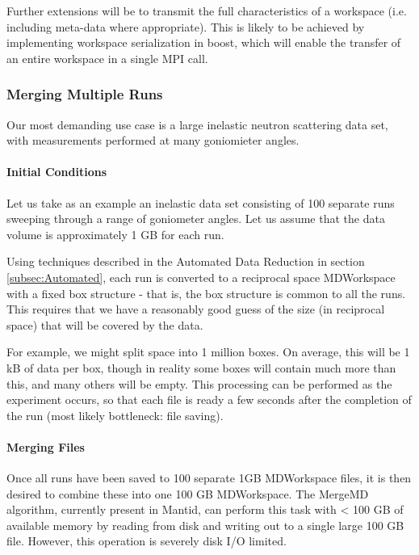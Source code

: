 Further extensions will be to transmit the full characteristics of a workspace (i.e. including meta-data where appropriate). This is likely to be achieved by implementing workspace serialization in boost, which will enable the transfer of an entire workspace in a single MPI call.

\subsubsection{Merging Multiple Runs}

Our most demanding use case is a large inelastic neutron scattering data set, with measurements performed at many goniomieter angles.

\paragraph{Initial Conditions}

Let us take as an example an inelastic data set consisting of 100 separate runs sweeping through a range of goniometer angles. Let us assume that the data volume is approximately 1 GB for each run.

Using techniques described in the Automated Data Reduction in section \ref{subsec:Automated}, each run is converted to a reciprocal space MDWorkspace with a fixed box structure - that is, the box structure is common to all the runs. This requires that we have a reasonably good guess of the size (in reciprocal space) that will be covered by the data. 

For example, we might split space into 1 million boxes. On average, this will be 1 kB of data per box, though in reality some boxes will contain much more than this, and many others will be empty. This processing can be performed as the experiment occurs, so that each file is ready a few seconds after the completion of the run (most likely bottleneck: file saving).

\paragraph{Merging Files}

Once all runs have been saved to 100 separate 1GB MDWorkspace files, it is then desired to combine these into one 100 GB MDWorkspace. The MergeMD algorithm, currently present in Mantid, can perform this task with < 100 GB of available memory by reading from disk and writing out to a single large 100 GB file. However, this operation is severely disk I/O limited.

